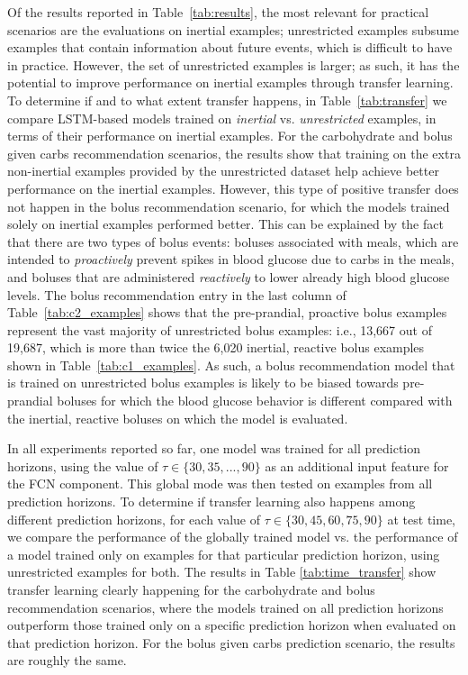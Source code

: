 \documentclass[graybox]{svmult}
\begin{document}
Of the results reported in Table~\ref{tab:results}, the most relevant for practical scenarios are the evaluations on inertial examples; unrestricted examples subsume examples that contain information about future events, which is difficult to have in practice. However, the set of unrestricted examples is larger; as such, it has the potential to improve performance on inertial examples through transfer learning. To determine if and to what extent transfer happens, in Table~\ref{tab:transfer} we compare LSTM-based models trained on {\it inertial} vs. {\it unrestricted} examples, in terms of their performance on inertial examples. For the carbohydrate and bolus given carbs recommendation scenarios, the results show that training on the extra non-inertial examples provided by the unrestricted dataset help achieve better performance on the inertial examples. However, this type of positive transfer does not happen in the bolus recommendation scenario, for which the models trained solely on inertial examples performed better. This can be explained by the fact that there are two types of bolus events: boluses associated with meals, which are intended to {\it proactively} prevent spikes in blood glucose due to carbs in the meals, and boluses that are administered {\it reactively} to lower already high blood glucose levels. The bolus recommendation entry in the last column of Table~\ref{tab:c2_examples} shows that the pre-prandial, proactive bolus examples represent the vast majority of unrestricted bolus examples: i.e., 13,667 out of 19,687, which is more than twice the 6,020 inertial, reactive bolus examples shown in Table~\ref{tab:c1_examples}. As such, a bolus recommendation model that is trained on unrestricted bolus examples is likely to be biased towards pre-prandial boluses for which the blood glucose behavior is different compared with the inertial, reactive boluses on which the model is evaluated.

In all experiments reported so far, one model was trained for all prediction horizons, using the value of $\tau \in \{30, 35, ..., 90\}$ as an additional input feature for the FCN component. This global mode was then tested on examples from all prediction horizons. To determine if transfer learning also happens among different prediction horizons, for each value of $\tau \in \{30, 45, 60, 75, 90\}$ at test time, we compare the performance of the globally trained model vs. the performance of a model trained only on examples for that particular prediction horizon, using unrestricted examples for both. The results in Table \ref{tab:time_transfer} show transfer learning clearly happening for the carbohydrate and bolus recommendation scenarios, where the models trained on all prediction horizons outperform those trained only on a specific prediction horizon when evaluated on that prediction horizon. For the bolus given carbs prediction scenario, the results are roughly the same.
\end{document}
